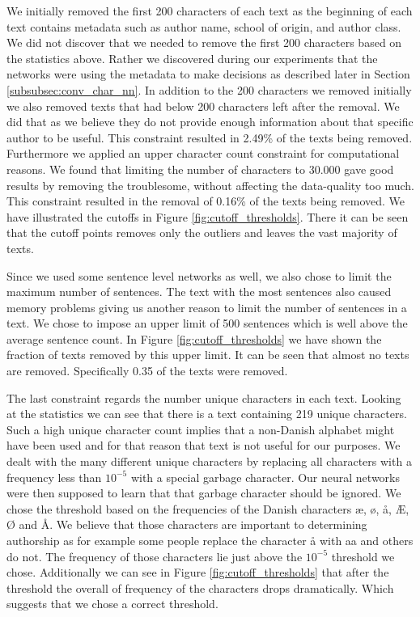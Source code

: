 We initially removed the first 200 characters of each text as the beginning of
each text contains metadata such as author name, school of origin, and author
class. We did not discover that we needed to remove the first 200 characters
based on the statistics above. Rather we discovered during our experiments
that the networks were using the metadata to make decisions as described later
in Section \ref{subsubsec:conv_char_nn}. In addition to the 200 characters we
removed initially we also removed texts that had below 200 characters left after
the removal. We did that as we believe they do not provide enough information
about that specific author to be useful. This constraint resulted in 2.49\%
of the texts being removed. Furthermore we applied an upper character count
constraint for computational reasons. We found that limiting the number of
characters to 30.000 gave good results by removing the troublesome, without
affecting the data-quality too much. This constraint resulted in the removal of
0.16\% of the texts being removed. We have illustrated the cutoffs in Figure
\ref{fig:cutoff_thresholds}. There it can be seen that the cutoff points removes
only the outliers and leaves the vast majority of texts.

Since we used some sentence level networks as well, we also chose to limit
the maximum number of sentences. The text with the most sentences also caused
memory problems giving us another reason to limit the number of sentences in a
text. We chose to impose an upper limit of 500 sentences which is well above the
average sentence count. In Figure \ref{fig:cutoff_thresholds} we have shown the
fraction of texts removed by this upper limit. It can be seen that almost no
texts are removed. Specifically 0.35 \textperthousand of the texts were removed.

The last constraint regards the number unique characters in each text. Looking
at the statistics we can see that there is a text containing 219 unique
characters. Such a high unique character count implies that a non-Danish
alphabet might have been used and for that reason that text is not useful for
our purposes. We dealt with the many different unique characters by replacing
all characters with a frequency less than $10^{-5}$ with a special garbage
character. Our neural networks were then supposed to learn that that garbage
character should be ignored. We chose the threshold based on the frequencies
of the Danish characters æ, ø, å, Æ, Ø and Å. We believe that those
characters are important to determining authorship as for example some people
replace the character å with aa and others do not. The frequency of those
characters lie just above the $10^{-5}$ threshold we chose. Additionally we can
see in Figure \ref{fig:cutoff_thresholds} that after the threshold the overall
of frequency of the characters drops dramatically. Which suggests that we chose
a correct threshold.

